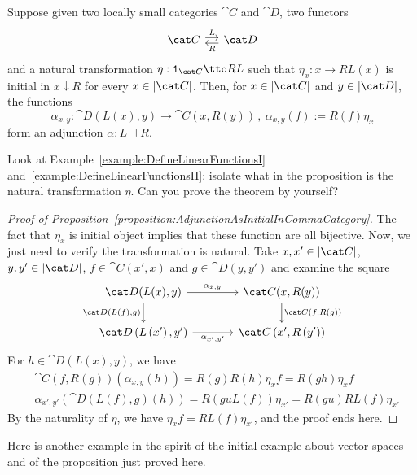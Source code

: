\begin{proposition}\label{proposition:AdjunctionAsInitialInCommaCategory}
Suppose given two locally small categories \(\cat C\) and \(\cat D\), two functors
\[\begin{tikzcd}[column sep=small]
\cat C \ar["L", r, shift left] & \cat D \ar["R", l, shift left]
\end{tikzcd}\]
and a natural transformation \(\eta : \id_{\cat C} \tto RL\) such that \(\eta_x : x \to RL(x)\) is initial in \(x {\downarrow} R\) for every \(x \in \obj{\cat C}\).  Then, for \(x \in \obj{\cat C}\) and \(y \in \obj{\cat D}\), the functions
\[\alpha_{x,y} : \cat D(L(x), y) \to \cat C(x, R(y)) \,,\ \alpha_{x,y}(f) := R(f)\eta_x\]
form an adjunction \(\alpha : L \dashv R\).
\end{proposition}

\begin{exercise}
Look at Example~\ref{example:DefineLinearFunctionsI} and~\ref{example:DefineLinearFunctionsII}: isolate what in the proposition is the natural transformation \(\eta\). Can you prove the theorem by yourself?
\end{exercise}

\begin{proof}[Proof of Proposition~\ref{proposition:AdjunctionAsInitialInCommaCategory}]
The fact that \(\eta_x\) is initial object implies that these function are all bijective. Now, we just need to verify the transformation is natural. Take \(x, x' \in \obj{\cat C}\), \(y, y' \in \obj{\cat D}\), \(f \in \cat C(x', x)\) and \(g \in \cat D(y, y')\) and examine the square
\[\begin{tikzcd}[column sep=large]
\cat D(L(x), y) \ar["{\cat D(L(f), g)}", d, swap] \ar["{\alpha_{x,y}}", r] & \cat C(x, R(y)) \ar["{\cat C(f, R(g))}", d] \\
\cat D\left(L\left(x'\right), y'\right) \ar["{\alpha_{x',y'}}", r, swap] & \cat C\left(x', R\left(y'\right)\right)
\end{tikzcd}\]
For \(h \in \cat D(L(x), y)\), we have
\begin{align*}
& \cat C(f, R(g)) (\alpha_{x,y} (h)) = R(g) R(h) \eta_x f = R(gh) \eta_x f \\
& \alpha_{x',y'} (\cat D (L(f), g)(h)) = R(guL(f)) \eta_{x'} = R(gu) RL(f) \eta_{x'}
\end{align*}
By the naturality of \(\eta\), we have \(\eta_x f = RL(f) \eta_{x'}\), and the proof ends here.
\end{proof}

Here is another example in the spirit of the initial example about vector spaces and of the proposition just proved here.

